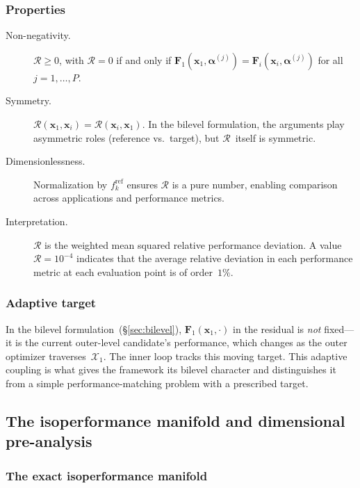 \subsubsection{Properties}

\begin{description}
    \item[Non-negativity.] $\mathcal{R} \geq 0$, with $\mathcal{R} = 0$ if and only if $\mathbf{F}_1(\mathbf{x}_1, \boldsymbol{\alpha}^{(j)}) = \mathbf{F}_i(\mathbf{x}_i, \boldsymbol{\alpha}^{(j)})$ for all $j = 1, \ldots, P$.
    \item[Symmetry.] $\mathcal{R}(\mathbf{x}_1, \mathbf{x}_i) = \mathcal{R}(\mathbf{x}_i, \mathbf{x}_1)$. In the bilevel formulation, the arguments play asymmetric roles (reference vs.\ target), but $\mathcal{R}$~itself is symmetric.
    \item[Dimensionlessness.] Normalization by $f_k^{\mathrm{ref}}$ ensures $\mathcal{R}$ is a pure number, enabling comparison across applications and performance metrics.
    \item[Interpretation.] $\mathcal{R}$ is the weighted mean squared relative performance deviation. A value $\mathcal{R} = 10^{-4}$ indicates that the average relative deviation in each performance metric at each evaluation point is of order~$1\%$.
\end{description}

\subsubsection{Adaptive target}
\label{sec:adaptive_target}

In the bilevel formulation~(\S\ref{sec:bilevel}), $\mathbf{F}_1(\mathbf{x}_1, \cdot)$ in the residual is \emph{not} fixed---it is the current outer-level candidate's performance, which changes as the outer optimizer traverses~$\mathcal{X}_1$. The inner loop tracks this moving target. This adaptive coupling is what gives the framework its bilevel character and distinguishes it from a simple performance-matching problem with a prescribed target.


\subsection{The isoperformance manifold and dimensional pre-analysis}
\label{sec:manifold}

\subsubsection{The exact isoperformance manifold}

